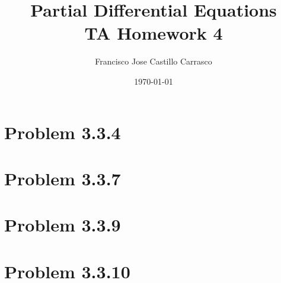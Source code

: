 




\title{Partial Differential Equations\\TA Homework 4}
\author{Francisco Jose Castillo Carrasco}
\date{\today}
\maketitle




\section*{Problem 3.3.4}


\section*{Problem 3.3.7}


\section*{Problem 3.3.9}


\section*{Problem 3.3.10}






